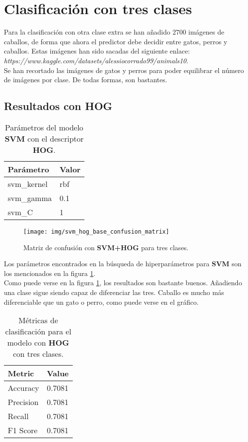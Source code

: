 \documentclass[12pt,letterpaper]{article}
\begin{document}
\section{Clasificación con tres clases}
Para la clasificación con otra clase extra se han añadido 2700 imágenes de caballos, de forma que ahora el predictor debe decidir entre gatos, perros y caballos. Estas imágenes han sido sacadas del siguiente enlace: \textit{https://www.kaggle.com/datasets/alessiocorrado99/animals10}.\\[6pt]
Se han recortado las imágenes de gatos y perros para poder equilibrar el número de imágenes por clase. De todas formas, son bastantes.
\subsection{Resultados con HOG}
\begin{table}[htp]
    \centering
    \begin{tabular}{ll}
    \hline
    \textbf{Parámetro} & \textbf{Valor} \\
    \hline
    svm\_kernel & rbf \\
    svm\_gamma & 0.1 \\
    svm\_C & 1 \\
    \hline
    \end{tabular}
    \caption{Parámetros del modelo \textbf{SVM} con el descriptor \textbf{HOG}.}
    \label{tab:svm_params3}
\end{table}

\begin{figure}[htp]
    \centering
    \texttt{[image: img/svm\_hog\_base\_confusion\_matrix]}
    \caption{Matriz de confusión con \textbf{SVM+HOG} para tres clases.}
    \label{fig:confusion_matrix}
\end{figure}

Los parámetros encontrados en la búsqueda de hiperparámetros para \textbf{SVM} son los mencionados en la figura \ref{tab:svm_params3}.\\[6pt]
Como puede verse en la figura \ref{fig:confusion_matrix}, los resultados son bastante buenos. Añadiendo una clase sigue siendo capaz de diferenciar las tres. Caballo es mucho más diferenciable que un gato o perro, como puede verse en el gráfico.

\begin{table}[htp]
    \centering
    \begin{tabular}{ll}
    \hline
    \textbf{Metric} & \textbf{Value} \\
    \hline
    Accuracy    & 0.7081 \\
    Precision   & 0.7081 \\
    Recall      & 0.7081 \\
    F1 Score    & 0.7081 \\
    \hline
    \end{tabular}
    \caption{Métricas de clasificación para el modelo con \textbf{HOG} con tres clases.}
    \label{tab:classification_metrics_hog_3}
\end{table}
\end{document}
